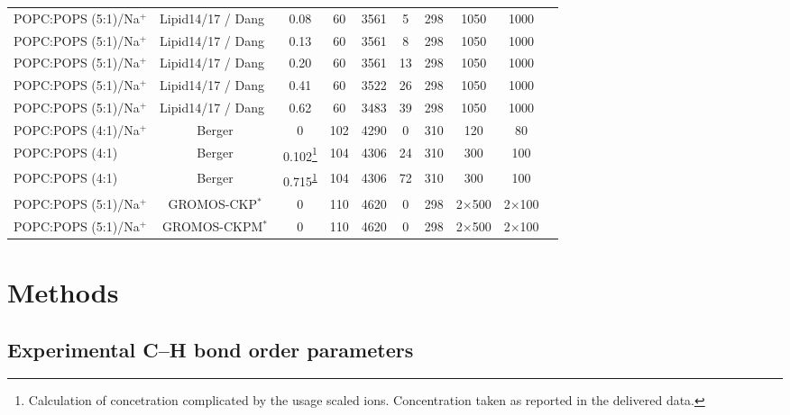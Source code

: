 \documentclass[aps,prl,superscriptaddress,twocolumn]{revtex4}
\begin{document}
\begin{table*}[tb]
\begin{tabular}{lccccccccc}
POPC:POPS (5:1)/Na$^{+}$  & Lipid14/17 \cite{dickson14,gould18} / Dang~\cite{smith94,dang06}  & 0.08  & 60  & 3561  & 5  & 298  & 1050  & 1000  & \cite{lipid17_cacl_series} \tabularnewline
POPC:POPS (5:1)/Na$^{+}$  & Lipid14/17 \cite{dickson14,gould18} / Dang~\cite{smith94,dang06}  & 0.13  & 60  & 3561  & 8  & 298  & 1050  & 1000  & \cite{lipid17_cacl_series} \tabularnewline
POPC:POPS (5:1)/Na$^{+}$  & Lipid14/17 \cite{dickson14,gould18} / Dang~\cite{smith94,dang06}  & 0.20  & 60 & 3561  & 13  & 298  & 1050  & 1000  & \cite{lipid17_cacl_series} \tabularnewline
POPC:POPS (5:1)/Na$^{+}$  & Lipid14/17 \cite{dickson14,gould18} / Dang~\cite{smith94,dang06}  & 0.41  & 60 & 3522  & 26  & 298  & 1050  & 1000  & \cite{lipid17_cacl_series} \tabularnewline
POPC:POPS (5:1)/Na$^{+}$  & Lipid14/17 \cite{dickson14,gould18} / Dang~\cite{smith94,dang06}  & 0.62  & 60 & 3483  & 39  & 298  & 1050  & 1000  & \cite{lipid17_cacl_series} \tabularnewline
\hline 
POPC:POPS (4:1)/Na$^{+}$  & Berger \cite{tieleman99,mukhopadhyay04}  & 0  & 102 & 4290  & 0  & 310  & 120  & 80  & \cite{bergerPOPSPOPC4:1mixtureT310K} \tabularnewline
POPC:POPS (4:1)  & Berger \cite{tieleman99,mukhopadhyay04}  & 0.102\footnote{\label{noteBerger}Calculation of concetration complicated by the
usage scaled ions. Concentration taken as reported in the delivered
data.}  & 104  & 4306  & 24  & 310  & 300  & 100  & \cite{POPCpopsBERGERwith102mMCa} \tabularnewline
POPC:POPS (4:1)  & Berger \cite{tieleman99,mukhopadhyay04}  & 0.715\textsuperscript{\ref{noteBerger}}  & 104 & 4306  & 72  & 310  & 300  & 100  & \cite{POPCpopsBERGERwith715mMCa} \tabularnewline
\hline 
POPC:POPS (5:1)/Na$^{+}$  & GROMOS-CKP$^*$ \cite{piggot12}  & 0  & 110 & 4620  & 0  & 298  & 2$\times$500  & 2$\times$100  & \cite{POPCpopsGROMOSCKPwithNa} \tabularnewline
POPC:POPS (5:1)/Na$^{+}$  & GROMOS-CKPM$^*$ \cite{piggot12}  & 0  & 110 & 4620  & 0  & 298  & 2$\times$500  & 2$\times$100  & \cite{POPCpopsGROMOSCKPMwithNa} \tabularnewline
\end{tabular}

\end{table*}

\section{Methods}

\subsection{Experimental C--H bond order parameters}%
\end{document}
